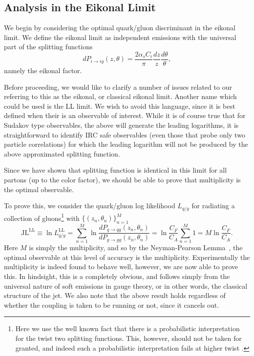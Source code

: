 \documentclass[letterpaper,11pt]{article}
\begin{document}
\subsection{Analysis in the Eikonal Limit}\label{sec:eik}

We begin by considering the optimal quark/gluon discriminant in the eikonal limit. We define the eikonal limit as independent emissions with the universal part of the splitting functions
\begin{equation}
\label{eq:LLemit}
dP_{i\to i g}(z,\theta) = \frac{2 \alpha_s C_i}{\pi} \frac{dz}{z}\frac{d\theta}{\theta},
\end{equation}
namely the eikonal factor.

Before proceeding, we would like to clarify a number of issues related to our referring to this as the eikonal, or classical eikonal limit. Another name which could be used is the LL limit. We wish to avoid this language, since it is best defined when their is an observable of interest. While it is of course true that for Sudakov type observables, the above will generate the leading logarithms, it is straightforward to identify IRC safe observables (even those that probe only two particle correlations) for which the leading logarithm will not be produced by the above approximated splitting function. 

Since we have shown that splitting function is identical in this limit for all partons (up to the color factor), we should be able to prove that multiplicity is the optimal observable.

To prove this, we consider the quark/gluon log likelihood $L_{q/g}$ for radiating a collection of gluons\footnote{Here we use the well known fact that there is a probabilistic interpretation for the twist two splitting functions. This, however, should not be taken for granted, and indeed such a probabilistic interpretation fails at higher twist \cite{Jaffe:1982pm}.} with $\{(z_n,\theta_n)\}_{n=1}^M$ 
\begin{equation}
\text{JL}^\text{LL} \equiv\ln L_{q/g}^\text{LL} = \sum_{n=1}^M \ln \frac{dP_{q\to qg}(z_n,\theta_n)}{dP_{g\to gg}(z_n,\theta_n)} = \ln \frac{C_F}{C_A} \sum_{n=1}^M 1 = M \ln \frac{C_F}{C_A}.
\end{equation}
Here $M$ is simply the multiplicity, and so by the Neyman-Pearson Lemma~\cite{neyman1933ix}, the optimal observable at this level of accuracy is the multiplicity. Experimentally the multiplicity is indeed found to behave well, however, we are now able to prove this. In hindsight, this is a completely obvious, and follows simply from the universal nature of soft emissions in gauge theory, or in other words, the classical structure of the jet.  We also note that the above result holds regardless of whether the coupling is taken to be running or not, since it cancels out. 
\end{document}
